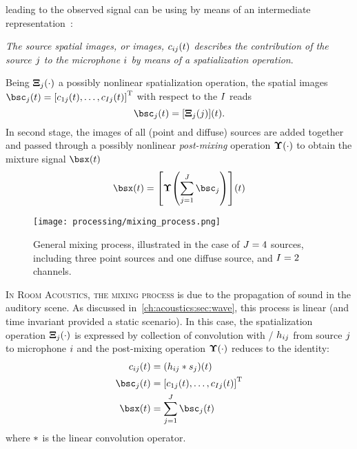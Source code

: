  leading to the observed signal can be
using by means of an intermediate representation~\cite{sturmel2012linear}:
\begin{center}
    \textit{The \emph{source spatial images}, or \emph{images},  $c_{ij}(t)$ describes the contribution
    of the source $j$ to the microphone $i$ by means of a spatialization
    operation}.
\end{center}
Being $\boldsymbol{\Xi}_{j}(\cdot)$ a possibly nonlinear spatialization operation, the spatial images
$\imgs_\idxSrc(t) = \ktranspose{\klist{\img_{1\idxSrc}(t), \dots, \img_{\numMics\idxSrc}(t)}}$ with respect to the $I$ reads
\begin{equation}
    \imgs_\idxSrc(t) = \kbracket{\spat_\idxSrc(\idxSrc)}(t)
    .
\end{equation}
In second stage, the images of all (point and diffuse) sources are added together and passed through a possibly
nonlinear \textit{post-mixing} operation $\boldsymbol{\Upsilon}(\cdot)$ to obtain the mixture signal $\mics(t)$
\begin{equation}
    \mics(t) = \kbracket{ \master\kparen{
                    \sum_{\idxSrc=1}^{\numSrcs} \imgs_\idxSrc
                    }}(t)
\end{equation}
\begin{figure}[t]
    \centering
    \texttt{[image: processing/mixing\_process.png]}
    \caption{General mixing process,
    illustrated in the case of $J = 4$ sources,
    including three point sources and one diffuse source, and $I = 2$ channels.}
    \label{fig:processing:mixing}
\end{figure}
\textsc{In Room Acoustics, the mixing process} is due to the propagation of sound in the auditory scene.
As discussed in~\cref{ch:acoustics:sec:wave}, this process is linear (and time invariant provided a static scenario).
In this case, the spatialization operation $\boldsymbol{\Xi}_{j}(\cdot)$ is expressed by
collection of convolution with \RIR/ $h_{ij}$
from source $j$ to microphone $i$ and the post-mixing operation $\boldsymbol{\Upsilon}(\cdot)$ reduces to the identity:
\begin{align}
    \img_{\idxMic\idxSrc}(t) &=  \kparen{h_{\idxMic\idxSrc} \conv \src_\idxSrc} (t) \\
    \imgs_\idxSrc(t) &=  \ktranspose{\klist{\img_{1\idxSrc}(t), \dots, \img_{\numMics\idxSrc}(t)}}\\
    \mics(t)         &= \sum_{\idxSrc=1}^{\numSrcs} \imgs_\idxSrc(t)
\end{align}
where $\ast$ is the linear convolution operator.

